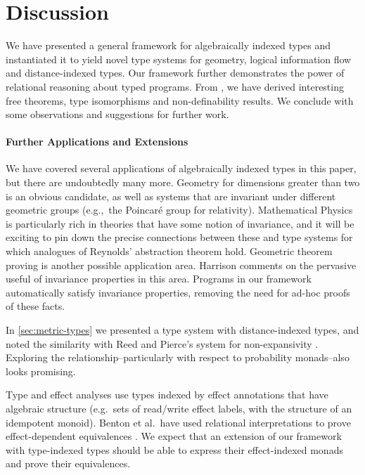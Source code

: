 \section{Discussion}
\label{sec:discussion}

We have presented a general framework for algebraically indexed types
and instantiated it to yield novel type systems for geometry, logical
information flow and distance-indexed types. Our framework further
demonstrates the power of relational reasoning about typed
programs. From , we have derived interesting
free theorems, type isomorphisms and non-definability results. We
conclude with some observations and suggestions for further work.

\paragraph{Further Applications and Extensions} We have covered
several applications of algebraically indexed types in this paper, but
there are undoubtedly many more. Geometry for dimensions greater than
two is an obvious candidate, as well as systems that are invariant
under different geometric groups (e.g.,~the Poincar\'{e} group for
relativity). Mathematical Physics is particularly rich in theories
that have some notion of invariance, and it will be exciting to pin
down the precise connections between these and type systems for which
analogues of Reynolds' abstraction theorem hold. Geometric theorem
proving is another possible application area. Harrison
\cite{harrison09without} comments on the pervasive useful of
invariance properties in this area. Programs in our framework
automatically satisfy invariance properties, removing the need for
ad-hoc proofs of these facts.

In \autoref{sec:metric-types} we presented a type system with
distance-indexed types, and noted the similarity with Reed and
Pierce's system for non-expansivity \cite{reed10distance}. Exploring
the relationship--particularly with respect to probability
monads--also looks promising.

Type and effect analyses use types indexed by effect annotations that
have algebraic structure (e.g.~sets of read/write effect labels, with
the structure of an idempotent monoid). Benton et al.~have used
relational interpretations to prove effect-dependent equivalences
\cite{benton06reading}. We expect that an extension of our framework
with type-indexed types should be able to express their effect-indexed
monads and prove their equivalences.

